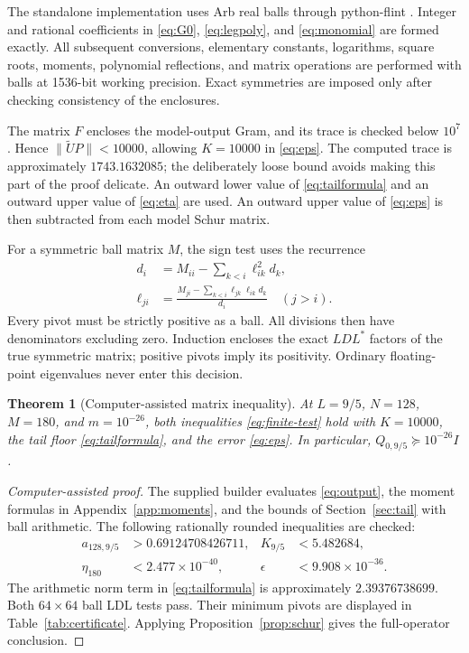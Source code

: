 \documentclass[11pt]{article}
\numberwithin{equation}{section}
\newtheorem{theorem}{Theorem}[section]
\theoremstyle{definition}
\theoremstyle{remark}
\newcommand{\norm}[1]{\lVert#1\rVert}
\begin{document}
The standalone implementation uses Arb real balls \cite{Johansson2017}
through python-flint \cite{PythonFlint}. Integer and rational coefficients
in \eqref{eq:G0}, \eqref{eq:legpoly}, and \eqref{eq:monomial} are formed
exactly. All subsequent conversions, elementary constants, logarithms,
square roots, moments, polynomial reflections, and matrix operations are
performed with balls at 1536-bit working precision. Exact symmetries are
imposed only after checking consistency of the enclosures.

The matrix $F$ encloses the model-output Gram, and its trace is checked
below $10^7$. Hence $\norm{\widetilde UP}<10000$, allowing $K=10000$
in \eqref{eq:eps}. The computed trace is approximately $1743.1632085$;
the deliberately loose bound avoids making this part of the proof delicate.
An outward lower value of \eqref{eq:tailformula} and an outward upper value
of \eqref{eq:eta} are used. An outward upper value of \eqref{eq:eps} is
then subtracted from each model Schur matrix.

For a symmetric ball matrix $M$, the sign test uses the recurrence
\begin{align*}
 d_i&=M_{ii}-\sum_{k<i}\ell_{ik}^2d_k,\\
 \ell_{ji}&=\frac{M_{ji}-\sum_{k<i}\ell_{jk}\ell_{ik}d_k}{d_i}\quad(j>i).
\end{align*}
Every pivot must be strictly positive as a ball. All divisions then have
denominators excluding zero. Induction encloses the exact $LDL^*$ factors
of the true symmetric matrix; positive pivots imply its positivity.
Ordinary floating-point eigenvalues never enter this decision.

\begin{theorem}[Computer-assisted matrix inequality]\label{thm:computation}
At $L=9/5$, $N=128$, $M=180$, and $m=10^{-26}$, both inequalities
\eqref{eq:finite-test} hold with $K=10000$, the tail floor
\eqref{eq:tailformula}, and the error \eqref{eq:eps}.
In particular, $Q_{0,9/5}\succeq10^{-26}I$.
\end{theorem}
\begin{proof}[Computer-assisted proof]
The supplied builder evaluates \eqref{eq:output}, the moment formulas in
Appendix~\ref{app:moments}, and the bounds of Section~\ref{sec:tail} with
ball arithmetic. The following rationally rounded inequalities are checked:
\begin{align*}
 a_{128,9/5}&>0.69124708426711,&K_{9/5}&<5.482684,\\
 \eta_{180}&<2.477\times10^{-40},&
 \epsilon&<9.908\times10^{-36}.
\end{align*}
The arithmetic norm term in \eqref{eq:tailformula} is approximately
$2.39376738699$. Both $64\times64$ ball LDL tests pass. Their minimum
pivots are displayed in Table~\ref{tab:certificate}. Applying
Proposition~\ref{prop:schur} gives the full-operator conclusion.
\end{proof}
\end{document}
